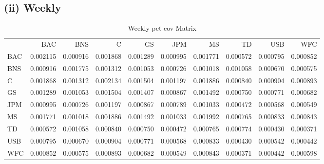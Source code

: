 \documentclass{article}
\begin{document}
\subsection*{(ii) Weekly}
\begin{table}
\caption{Weekly pct cov Matrix}
\label{tab:weekly_pct_cov}
\begin{tabular}{lrrrrrrrrr}
 & BAC & BNS & C & GS & JPM & MS & TD & USB & WFC \\
BAC & 0.002115 & 0.000916 & 0.001868 & 0.001289 & 0.000995 & 0.001771 & 0.000572 & 0.000795 & 0.000852 \\
BNS & 0.000916 & 0.001775 & 0.001312 & 0.001053 & 0.000726 & 0.001018 & 0.001058 & 0.000670 & 0.000575 \\
C & 0.001868 & 0.001312 & 0.002134 & 0.001504 & 0.001197 & 0.001886 & 0.000840 & 0.000904 & 0.000893 \\
GS & 0.001289 & 0.001053 & 0.001504 & 0.001407 & 0.000867 & 0.001492 & 0.000750 & 0.000771 & 0.000682 \\
JPM & 0.000995 & 0.000726 & 0.001197 & 0.000867 & 0.000789 & 0.001033 & 0.000472 & 0.000568 & 0.000549 \\
MS & 0.001771 & 0.001018 & 0.001886 & 0.001492 & 0.001033 & 0.001992 & 0.000765 & 0.000833 & 0.000843 \\
TD & 0.000572 & 0.001058 & 0.000840 & 0.000750 & 0.000472 & 0.000765 & 0.000774 & 0.000430 & 0.000371 \\
USB & 0.000795 & 0.000670 & 0.000904 & 0.000771 & 0.000568 & 0.000833 & 0.000430 & 0.000542 & 0.000442 \\
WFC & 0.000852 & 0.000575 & 0.000893 & 0.000682 & 0.000549 & 0.000843 & 0.000371 & 0.000442 & 0.000598 \\
\end{tabular}
\end{table}
\end{document}
